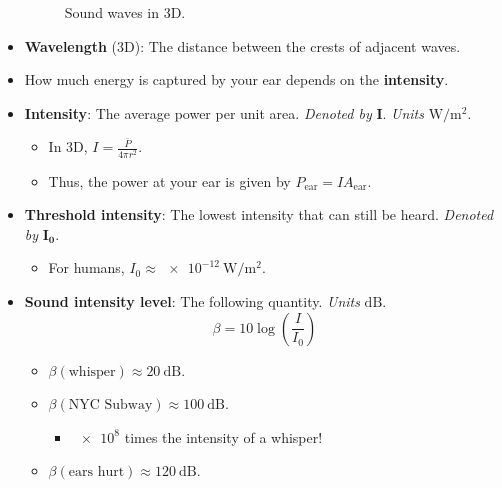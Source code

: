 \documentclass[../notes.tex]{subfiles}
\begin{document}
\begin{itemize}
\begin{figure}[h!]
        \caption{Sound waves in 3D.}
        \label{fig:3DSoundWaves}
    \end{figure}
    \item \textbf{Wavelength} (3D): The distance between the crests of adjacent waves.
    \item How much energy is captured by your ear depends on the \textbf{intensity}.
    \item \textbf{Intensity}: The average power per unit area. \emph{Denoted by} $\bm{I}$. \emph{Units} $\si{\watt\per\square\meter}$.
    \begin{itemize}
        \item In 3D, $I=\frac{\bar{P}}{4\pi r^2}$.
        \item Thus, the power at your ear is given by $P_\text{ear}=IA_\text{ear}$.
    \end{itemize}
    \item \textbf{Threshold intensity}: The lowest intensity that can still be heard. \emph{Denoted by} $\bm{I_0}$.
    \begin{itemize}
        \item For humans, $I_0\approx\SI{e-12}{\watt\per\square\meter}$.
    \end{itemize}
    \item \textbf{Sound intensity level}: The following quantity. \emph{Units} $\si{\deci\bel}$.
    \begin{equation*}
        \beta = 10\log\left( \frac{I}{I_0} \right)
    \end{equation*}
    \begin{itemize}
        \item $\beta(\text{whisper})\approx\SI{20}{\deci\bel}$.
        \item $\beta(\text{NYC Subway})\approx\SI{100}{\deci\bel}$.
        \begin{itemize}
            \item $\num{e8}$ times the intensity of a whisper!
        \end{itemize}
        \item $\beta(\text{ears hurt})\approx\SI{120}{\deci\bel}$.
    \end{itemize}
\end{itemize}
\end{document}
